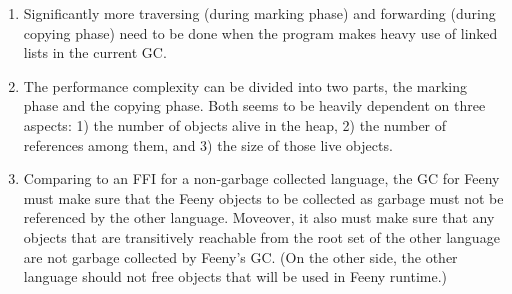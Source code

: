 \documentclass[notitlepage]{report}
\begin{document}
\begin{enumerate}
	\item
		Significantly more traversing (during marking phase) and forwarding (during copying phase) need to be done when the program makes heavy use of linked lists in the current GC.
	\item
		The performance complexity can be divided into two parts, the marking phase and the copying phase. Both seems to be heavily dependent on three aspects: 1) the number of objects alive in the heap, 2) the number of references among them, and 3) the size of those live objects.
	\item
		Comparing to an FFI for a non-garbage collected language, the GC for Feeny must make sure that the Feeny objects to be collected as garbage must not be referenced by the other language. Moveover, it also must make sure that any objects that are transitively reachable from the root set of the other language are not garbage collected by Feeny's GC. (On the other side, the other language should not free objects that will be used in Feeny runtime.)
\end{enumerate}
\end{document}
